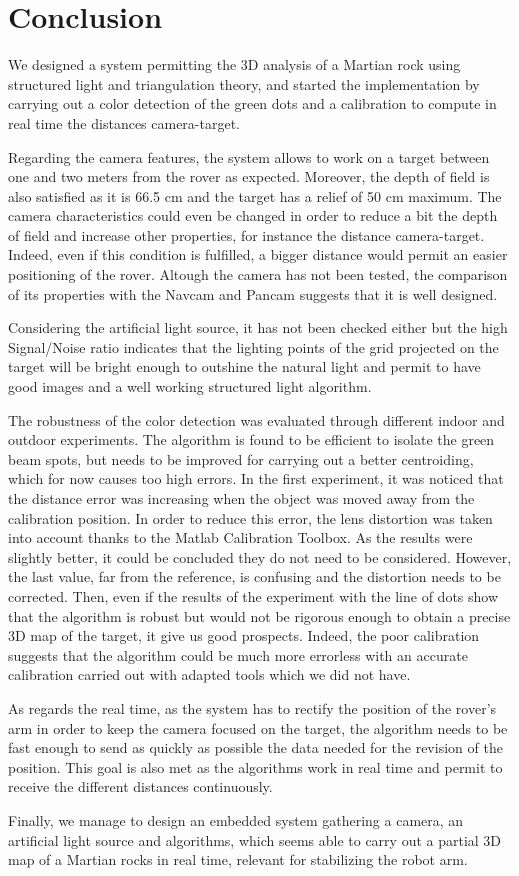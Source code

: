 \chapter*{Conclusion}

We designed a system permitting the 3D analysis of a Martian rock using structured light and triangulation theory, and started the implementation by carrying out a color detection of the green dots and a calibration to compute in real time the distances camera-target.

Regarding the camera features, the system allows to work on a target between one and two meters from the rover as expected. Moreover, the depth of field is also satisfied as it is 66.5 cm and the target has a relief of 50 cm maximum. The camera characteristics could even be changed in order to reduce a bit the depth of field and increase other properties, for instance the distance camera-target. Indeed, even if this condition is fulfilled, a bigger distance would permit an easier positioning of the rover. Altough the camera has not been tested, the comparison of its properties with the Navcam and Pancam suggests that it is well designed.

Considering the artificial light source, it has not been checked either but the high Signal/Noise ratio indicates that the lighting points of the grid projected on the target will be bright enough to outshine the natural light and permit to have good images and a well working structured light algorithm.

The robustness of the color detection was evaluated through different indoor and outdoor experiments. The algorithm is found to be efficient to isolate the green beam spots, but needs to be improved for carrying out a better centroiding, which for now causes too high errors. In the first experiment, it was noticed that the distance error was increasing when the object was moved away from the calibration position. In order to reduce this error, the lens distortion was taken into account thanks to the Matlab Calibration Toolbox. As the results were slightly better, it could be concluded they do not need to be considered. However, the last value, far from the reference, is confusing and the distortion needs to be corrected. Then, even if the results of the experiment with the line of dots show that the algorithm is robust but would not be rigorous enough to obtain a precise 3D map of the target, it give us good prospects. Indeed, the poor calibration suggests that the algorithm could be much more errorless with an accurate calibration carried out with adapted tools which we did not have. 

As regards the real time, as the system has to rectify the position of the rover's arm in order to keep the camera focused on the target, the algorithm needs to be fast enough to send as quickly as possible the data needed for the revision of the position. This goal is also met as the algorithms work in real time and permit to receive the different distances continuously.

Finally, we manage to design an embedded system gathering a camera, an artificial light source and algorithms, which seems able to carry out a partial 3D map of a Martian rocks in real time, relevant for stabilizing the robot arm.